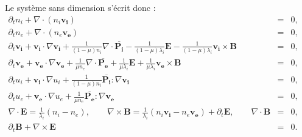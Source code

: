Le système sans dimension s'écrit donc :
\begin{eqnarray}
  \label{eq:model_adbi_ri} \partial_t n_i + \nabla \cdot \left(n_i \boldsymbol{v_i}\right) &=& 0, \qquad \\
  \label{eq:model_adbi_re} \partial_t n_e + \nabla \cdot \left(n_e \boldsymbol{v_e}\right) &=& 0, \\
  \label{eq:model_adbi_vi} \partial_t  \boldsymbol{v_i} +\boldsymbol{v_i} \cdot \nabla \boldsymbol{v_i} + \frac{1}{(1-\mu) n_i} \nabla \cdot \overline{\boldsymbol{P_i}} - \frac{1}{(1-\mu)\lambda_i} \boldsymbol{E} - \frac{1}{(1-\mu)\lambda_i}  \boldsymbol{v_i} \times \boldsymbol{B} &=& 0 ,\\
  \label{eq:model_adbi_ve}  \partial_t  \boldsymbol{v_e} +\boldsymbol{v_e} \cdot \nabla \boldsymbol{v_e} + \frac{1}{\mu n_e} \nabla \cdot \overline{\boldsymbol{P_e}} + \frac{1}{\mu \lambda_i}  \boldsymbol{E} + \frac{1}{\mu \lambda_i} \boldsymbol{v_e} \times \boldsymbol{B} &=& 0 ,\\
  \label{eq:model_adbi_ui} \partial_t  u_i + \boldsymbol{v_i} \cdot \nabla u_i   + \frac{1}{(1-\mu)n_i} \overline{\boldsymbol{P_i}} : \nabla \boldsymbol{v_i}   &=& 0 ,\\
\label{eq:model_adbi_ue} \partial_t  u_e + \boldsymbol{v_e} \cdot \nabla u_e   + \frac{1}{\mu n_e} \overline{\boldsymbol{P_e}} : \nabla \boldsymbol{v_e}   &=& 0 ,\\
\label{eq:model_adbi_EB1} \nabla \cdot \boldsymbol{E} =   \frac{1}{\lambda_i} (n_i -n_e) ,\qquad \nabla \times \boldsymbol{B} = \frac{1}{\lambda_i} (n_i \boldsymbol{v_i} - n_e \boldsymbol{v_e}) +  \partial_t \boldsymbol{E} ,
\qquad \nabla \cdot \boldsymbol{B} &=& 0  ,  \\
\label{eq:model_adbi_EB4}  \partial_t \boldsymbol{B}  + \nabla \times \boldsymbol{E}  &=& 0.

\end{eqnarray}
